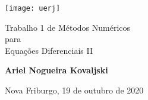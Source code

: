 \begin{titlepage}
    \begin{center}
        \vspace*{1cm}

        \texttt{[image: uerj]}

        {\Huge
           Trabalho 1 de Métodos Numéricos \\
           para \\
           Equações Diferenciais II \par
        }

        \vspace{1.5cm}

        \textbf{Ariel Nogueira Kovaljski}

        \vspace{0.5cm}

        Nova Friburgo, 19 de outubro de 2020
        \vfill

    \end{center}
\end{titlepage}